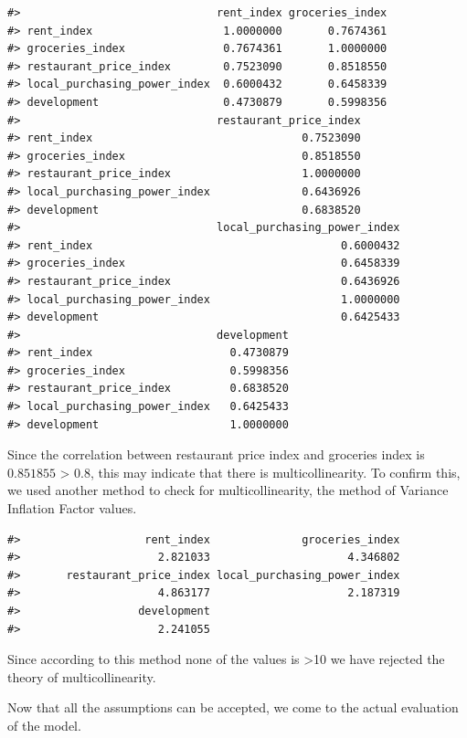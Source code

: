 \documentclass[
  11pt,
  a4paper,
  twoside]{scrbook}
\begin{document}
\begin{verbatim}
#>                              rent_index groceries_index
#> rent_index                    1.0000000       0.7674361
#> groceries_index               0.7674361       1.0000000
#> restaurant_price_index        0.7523090       0.8518550
#> local_purchasing_power_index  0.6000432       0.6458339
#> development                   0.4730879       0.5998356
#>                              restaurant_price_index
#> rent_index                                0.7523090
#> groceries_index                           0.8518550
#> restaurant_price_index                    1.0000000
#> local_purchasing_power_index              0.6436926
#> development                               0.6838520
#>                              local_purchasing_power_index
#> rent_index                                      0.6000432
#> groceries_index                                 0.6458339
#> restaurant_price_index                          0.6436926
#> local_purchasing_power_index                    1.0000000
#> development                                     0.6425433
#>                              development
#> rent_index                     0.4730879
#> groceries_index                0.5998356
#> restaurant_price_index         0.6838520
#> local_purchasing_power_index   0.6425433
#> development                    1.0000000
\end{verbatim}

Since the correlation between restaurant price index and groceries index is
\(0.851855\) \textgreater{} 0.8, this may indicate that there is multicollinearity. To confirm this, we used another method to check for multicollinearity, the method of Variance Inflation Factor values.

\begin{verbatim}
#>                   rent_index              groceries_index 
#>                     2.821033                     4.346802 
#>       restaurant_price_index local_purchasing_power_index 
#>                     4.863177                     2.187319 
#>                  development 
#>                     2.241055
\end{verbatim}

Since according to this method none of the values is \textgreater10 we have rejected the theory of multicollinearity.

Now that all the assumptions can be accepted, we come to the actual evaluation of the model.
\end{document}
